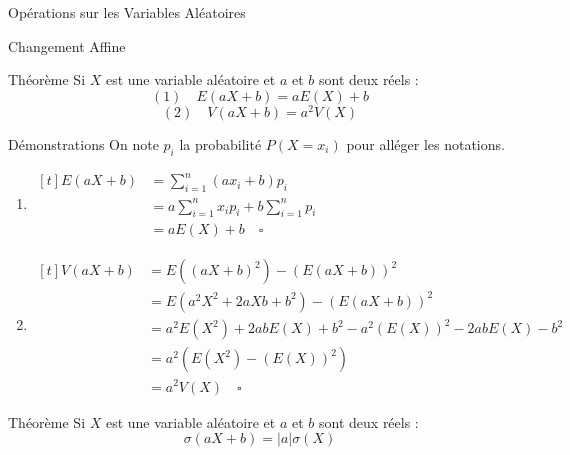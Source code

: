 \documentclass{cours}
\begin{document}
    \begin{Gpartie}{Opérations sur les Variables Aléatoires} 
        \begin{Spartie}{Changement Affine} 
            \begin{SSpartie}{Théorème} 
                Si $X$ est une variable aléatoire et $a$ et $b$ sont deux réels : \[(1)\quad E(aX+b)=aE(X)+b\] \[(2)\quad V(aX+b)=a^2V(X)\]
                \begin{SSSpartie}{Démonstrations}
                    On note $p_i$ la probabilité $P(X=x_i)$ pour alléger les notations.
                    \begin{enumerate}[(1),leftmargin=4ex]
                        \item $\begin{aligned}[t]
                            E(aX+b)&=\sum_{i=1}^n\left(a x_i+b\right)p_i \\
                            &=a\sum_{i=1}^n x_i p_i+b\sum_{i=1}^np_i \\
                            &=aE(X)+b\quad\square
                        \end{aligned}$
                        \item $\begin{aligned}[t]
                            V(aX+b)&=E\left((aX+b)^2\right)-\left(E(aX+b)\right)^2 \\
                            &=E\left(a^2X^2+2aXb+b^2\right)-\left(E(aX+b)\right)^2 \\
                            &=a^2E\left(X^2\right)+2abE(X)+b^2-a^2\left(E(X)\right)^2-2abE(X)-b^2 \\
                            &=a^2\left(E\left(X^2\right)-\left(E(X)\right)^2\right) \\
                            &=a^2V(X)\quad\square
                        \end{aligned}$
                    \end{enumerate}
                \end{SSSpartie}
            \end{SSpartie}
            \begin{SSpartie}{Théorème} 
                Si $X$ est une variable aléatoire et $a$ et $b$ sont deux réels : \[\sigma(aX+b)=\lvert a\rvert \sigma(X)\]
\end{SSpartie}
\end{Spartie}
\end{Gpartie}
\end{document}
